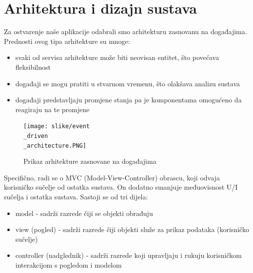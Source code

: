 \chapter{Arhitektura i dizajn sustava}
	
	Za ostvarenje naše aplikacije odabrali smo arhitekturu zasnovanu na događajima. Prednosti ovog tipa arhitekture su mnoge: 
	\begin{itemize}
		\item svaki od servisa arhitekture može biti neovisan entitet, što povećava fleksibilnost 
		\item događaji se mogu pratiti u stvarnom vremenu, što olakšava analizu sustava
		\item događaji predstavljaju promjene stanja pa je komponentama omogućeno da reagiraju na te promjene
	\end{itemize}
	
				\begin{figure}[H]
			\texttt{[image: slike/event\\\_driven\\\_architecture.PNG]} %
			\centering
			\caption{Prikaz arhitekture zasnovane na događajima}
			\label{event_driven_architecture}
		\end{figure}
		
	Specifično, radi se o MVC (Model-View-Controller) obrascu, koji odvaja korisničko sučelje od ostatka sustava. On dodatno smanjuje međuovisnost U/I sučelja i ostatka sustava. Sastoji se od tri dijela:
	
		\begin{itemize}
			\item model - sadrži razrede čiji se objekti obrađuju
			\item view (pogled) - sadrži razrede čiji objekti služe za prikaz podataka (korisničko sučelje)
			\item controller (nadglednik) - sadrži razrede koji upravljaju i rukuju korisničkom interakcijom s pogledom i modelom
		\end{itemize}
		
